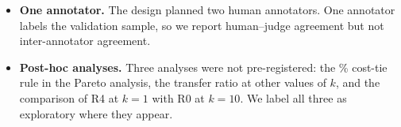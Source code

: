 \begin{itemize}
\item \textbf{One annotator.} The design planned two human annotators. One annotator labels the validation sample, so we report human--judge agreement but not inter-annotator agreement.
\item \textbf{Post-hoc analyses.} Three analyses were not pre-registered: the \% cost-tie rule in the Pareto analysis, the transfer ratio at other values of $k$, and the comparison of R4 at $k = 1$ with R0 at $k = 10$. We label all three as exploratory where they appear.
\end{itemize}

